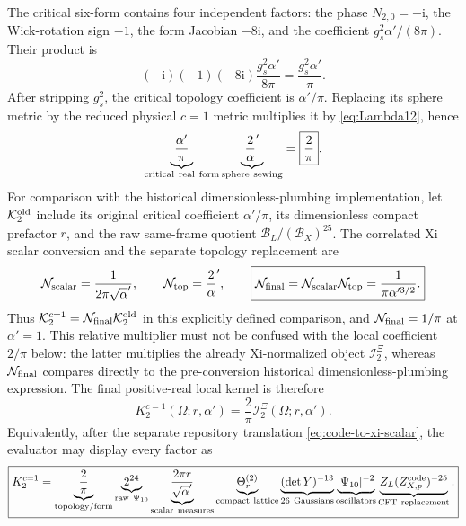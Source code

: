 \documentclass[11pt]{article}
\numberwithin{equation}{section}
\newcommand{\A}{\alpha'}
\newcommand{\ii}{\mathrm i}
\newcommand{\cB}{\mathcal B}
\newcommand{\cI}{\mathcal I}
\newcommand{\cK}{\mathcal K}
\newcommand{\cN}{\mathcal N}
\begin{document}
The critical six-form contains four independent factors: the phase
$N_{2,0}=-\ii$, the Wick-rotation sign $-1$, the form Jacobian $-8\ii$, and
the coefficient $g_s^2\A/(8\pi)$.  Their product is
\begin{equation}
 (-\ii)(-1)(-8\ii)\frac{g_s^2\A}{8\pi}
 =\frac{g_s^2\A}{\pi}.
 \label{eq:critical-positive-full}
\end{equation}
After stripping $g_s^2$, the critical topology coefficient is $\A/\pi$.
Replacing its sphere metric by the reduced physical $c=1$ metric multiplies
it by \eqref{eq:Lambda12}, hence
\begin{equation}
 \underbrace{\frac{\A}{\pi}}_{\rm critical\ real\ form}
 \underbrace{\frac2\A}_{\rm sphere\ sewing}
 =\boxed{\frac2\pi}.
 \label{eq:final-external-coefficient-full}
\end{equation}
For comparison with the historical dimensionless-plumbing implementation,
let $\cK_2^{\rm old}$ include its original critical coefficient $\A/\pi$,
its dimensionless compact prefactor $r$, and the raw same-frame quotient
$\cB_L/(\cB_X)^{25}$.  The correlated Xi scalar conversion and the separate
topology replacement are
\begin{equation}
 \cN_{\rm scalar}=\frac1{2\pi\sqrt\A},
 \qquad
 \cN_{\rm top}=\frac2\A,
 \qquad
 \boxed{\cN_{\rm final}
 =\cN_{\rm scalar}\cN_{\rm top}
 =\frac1{\pi\A^{3/2}}.}
 \label{eq:final-normalization-relative-old}
\end{equation}
Thus $\cK_2^{c=1}=\cN_{\rm final}\cK_2^{\rm old}$ in this explicitly
defined comparison, and $\cN_{\rm final}=1/\pi$ at $\A=1$.  This relative
multiplier must not be confused with the local coefficient $2/\pi$ below:
the latter multiplies the already Xi-normalized object $\cI_2^\Xi$, whereas
$\cN_{\rm final}$ compares directly to the pre-conversion historical
dimensionless-plumbing expression.
The final positive-real local kernel is therefore
\begin{equation}
 \boxed{
 K_2^{c=1}(\Omega;r,\A)
 =\frac2\pi\cI_2^\Xi(\Omega;r,\A).}
 \label{eq:final-kernel-full}
\end{equation}
Equivalently, after the separate repository translation
\eqref{eq:code-to-xi-scalar}, the evaluator may display every factor as
\begin{equation}
 \boxed{
 K_2^{c=1}
 =\underbrace{\frac2\pi}_{\rm topology/form}
 \underbrace{2^{24}}_{\rm raw\ \Psi_{10}}
 \underbrace{\frac{2\pi r}{\sqrt\A}}_{\rm scalar\ measures}
 \underbrace{\Theta_r^{(2)}}_{\rm compact\ lattice}
 \underbrace{(\det Y)^{-13}}_{26\ \rm Gaussians}
 \underbrace{|\Psi_{10}|^{-2}}_{\rm oscillators}
 \underbrace{Z_L (Z_{X,p}^{\rm code})^{-25}}_{\rm CFT\ replacement}.}
 \label{eq:factorized-final-kernel}
\end{equation}
\end{document}
